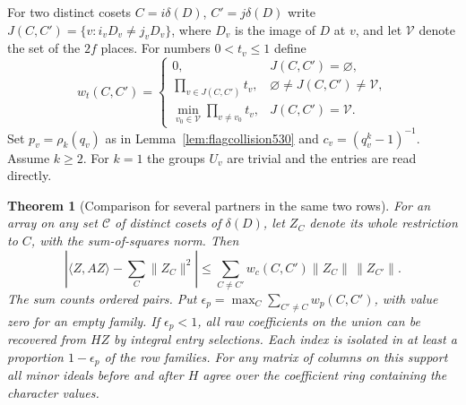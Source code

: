 \documentclass[a4paper,11pt]{article}
\newtheorem{theorem}[proposition]{Theorem}
\theoremstyle{definition}
\theoremstyle{remark}
\numberwithin{equation}{section}
\begin{document}
For two distinct cosets \(C=i\delta(D)\), \(C'=j\delta(D)\)
write \(J(C,C')=\{v:i_vD_v\ne j_vD_v\}\), where
\(D_v\) is the image of \(D\) at \(v\), and let \(\mathcal V\)
denote the set of the \(2f\) places. For numbers \(0<t_v\le1\)
define
\[
 w_t(C,C')=
 \begin{cases}
 0,&J(C,C')=\varnothing,\\
 \prod_{v\in J(C,C')} t_v,&\varnothing\ne J(C,C')\ne\mathcal V,\\
 \min_{v_0\in\mathcal V}\prod_{v\ne v_0}t_v,&J(C,C')=\mathcal V.
 \end{cases}
\]
Set \(p_v=\rho_k(q_v)\) as in Lemma~\ref{lem:flagcollision530}
and \(c_v=(q_v^k-1)^{-1}\). Assume \(k\ge2\). For \(k=1\)
the groups \(U_v\) are trivial and the entries are read directly.

\begin{theorem}[Comparison for several partners in the same two rows]
\leavevmode\label{thm:cosetcomparison531}
For an array on any set \(\mathcal C\) of distinct cosets
of \(\delta(D)\), let \(Z_C\) denote its whole restriction
to \(C\), with the sum-of-squares norm. Then
\[
 \left|\langle Z,AZ\rangle-\sum_C\|Z_C\|^2\right|
 \le \sum_{C\ne C'} w_c(C,C')\|Z_C\|\,\|Z_{C'}\|.
\]
The sum counts ordered pairs. Put
\(\epsilon_p=\max_C\sum_{C'\ne C}w_p(C,C')\), with value zero
for an empty family. If \(\epsilon_p<1\), all raw coefficients
on the union can be recovered from \(HZ\) by integral entry
selections. Each index is isolated in at least a proportion
\(1-\epsilon_p\) of the row families. For any matrix of columns
on this support all minor ideals before and after \(H\) agree
over the coefficient ring containing the character values.
\end{theorem}
\end{document}
